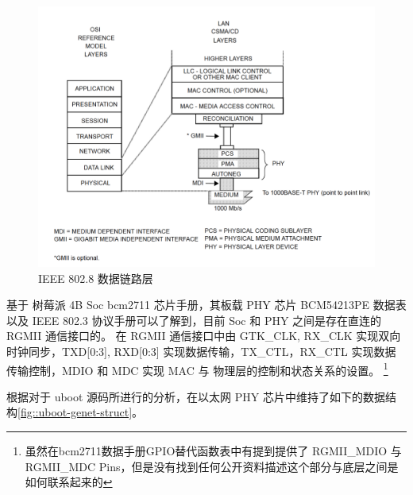     \begin{figure}[ht]
        \centering
        \includegraphics[scale=0.4]{imgs/data_link_layers.jpg}
        \caption{IEEE 802.8 数据链路层}    \label{fig::dataLink}
    \end{figure}

    基于 树莓派 4B Soc bcm2711 芯片手册，其板载 PHY 芯片 BCM54213PE 数据表以及 IEEE 802.3 协议手册可以了解到，目前 Soc 和 PHY 之间是存在直连的 RGMII 通信接口的。
    在 RGMII 通信接口中由 GTK\_CLK, RX\_CLK 实现双向时钟同步，TXD[0:3], RXD[0:3] 实现数据传输，TX\_CTL，RX\_CTL 实现数据传输控制，MDIO 和 MDC 实现 MAC 与 物理层的控制和状态关系的设置。
    \footnote{虽然在bcm2711数据手册GPIO替代函数表中有提到提供了 RGMII\_MDIO 与 RGMII\_MDC Pins，但是没有找到任何公开资料描述这个部分与底层之间是如何联系起来的}



    根据对于 uboot 源码所进行的分析，在以太网 PHY 芯片中维持了如下的数据结构\ref{fig::uboot-genet-struct}。

